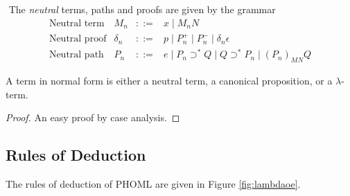 \documentclass[a4paper,UKenglish]{lipics-v2016}
\theoremstyle{plain}
\theoremstyle{definition}
\begin{document}
\begin{definition}[Neutral]$ $
The \emph{neutral} terms, paths and proofs are given by the grammar
\[ \begin{array}{lrcl}
\text{Neutral term} & M_n & ::= & x \mid M_n N \\
\text{Neutral proof} & \delta_n & ::= & p \mid P_n^+ \mid P_n^- \mid \delta_n \epsilon \\
\text{Neutral path} & P_n & ::= & e \mid P_n \supset^* Q \mid Q \supset^* P_n \mid (P_n)_{MN} Q
\end{array} \]
\end{definition}

\begin{lemma}
A term in normal form is either a neutral term, a canonical proposition, or a $\lambda$-term.
\end{lemma}

\begin{proof}
An easy proof by case analysis.
\end{proof}

\subsection{Rules of Deduction}

The rules of deduction of PHOML are given in Figure \ref{fig:lambdaoe}.
\end{document}
